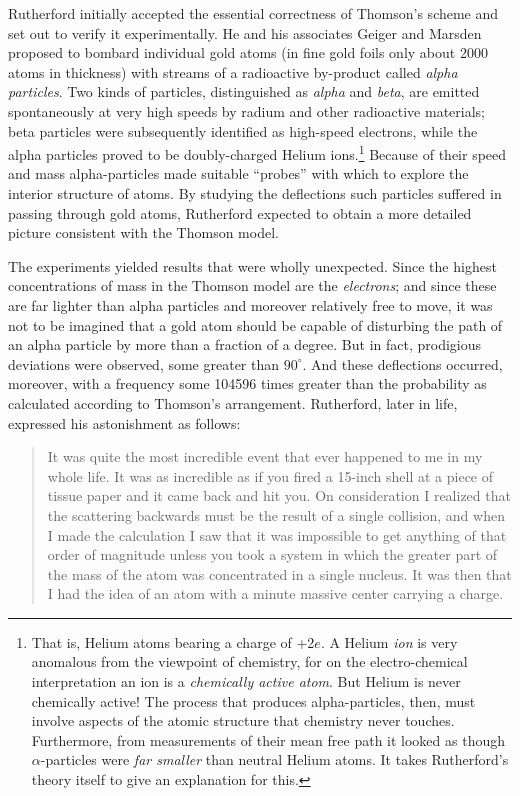 Rutherford initially accepted the essential correctness of Thomson's
scheme and set out to verify it experimentally. He and his associates
Geiger and Marsden proposed to bombard individual gold atoms (in fine
gold foils only about 2000 atoms in thickness) with streams of a
radioactive by-product called \emph{alpha particles}. Two kinds of
particles, distinguished as \emph{alpha} and \emph{beta}, are emitted
spontaneously at very high speeds by radium and other radioactive
materials; beta particles were subsequently identified as high-speed
electrons, while the alpha particles proved to be doubly-charged Helium
ions.\footnote{That is, Helium atoms bearing a charge of +2$e$. A
  Helium \emph{ion} is very anomalous from the viewpoint of chemistry,
  for on the electro-chemical interpretation an ion is a
  \emph{chemically active atom}. But Helium is never chemically active!
  The process that produces alpha-particles, then, must involve aspects
  of the atomic structure that chemistry never touches. Furthermore,
  from measurements of their mean free path it
  looked as though $\alpha$-particles were \emph{far smaller} than
  neutral Helium atoms. It takes Rutherford's theory itself to give an
  explanation for this.} Because of their speed and mass alpha-particles
made suitable ``probes'' with which to explore the interior structure of
atoms. By studying the deflections such particles suffered in passing
through gold atoms, Rutherford expected to obtain a more detailed
picture consistent with the Thomson model.

The experiments yielded results that were wholly unexpected. Since the
highest concentrations of mass in the Thomson model are the
\emph{electrons}; and since these are far lighter than alpha particles
and moreover relatively free to move, it was not to be imagined that a
gold atom should be capable of disturbing the path of an alpha particle
by more than a fraction of a degree. But in fact, prodigious deviations
were observed, some greater than $90^\circ$. And these deflections occurred,
moreover, with a frequency some 104596 times greater than the
probability as calculated according to Thomson's arrangement.
Rutherford, later in life, expressed his astonishment as follows:

\begin{quote}
It was quite the most incredible event that ever happened to me in my
whole life. It was as incredible as if you fired a 15-inch shell at a
piece of tissue paper and it came back and hit you. On consideration I
realized that the scattering backwards must be the result of a single
collision, and when I made the calculation I saw that it was impossible
to get anything of that order of magnitude unless you took a system in
which the greater part of the mass of the atom was concentrated in a
single nucleus. It was then that I had the idea of an atom with a minute
massive center carrying a charge.
\end{quote}

